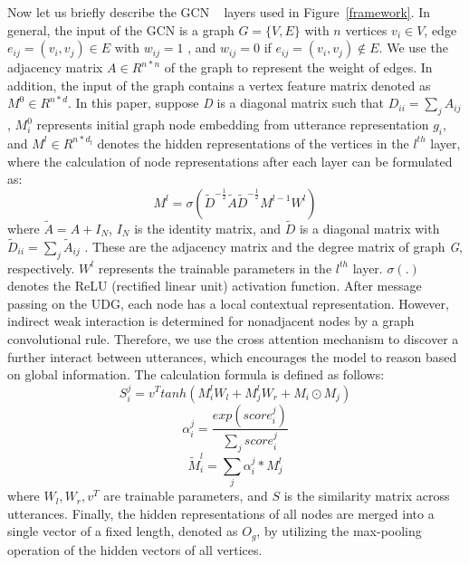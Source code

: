 \documentclass[letterpaper]{article}
\begin{document}
Now let us briefly describe the GCN ~\cite{kipf2016semi} layers used in Figure~\ref{framework}. In general, the input of the GCN is a graph $G=\{V,E\}$ with $n$ vertices $v_i \in V$, edge $e_{ij}=(v_i,v_j) \in E$ with $w_{ij} = 1$ , and $w_{ij} = 0$ if $e_{ij}=(v_i,v_j) \not\in E$. We use the adjacency matrix $A \in R^{n*n}$ of the graph to represent the weight of edges. In addition, the input of the graph contains a vertex feature matrix denoted as $ M^0 \in R^{n*d}$. In this paper, suppose \textit{D} is a diagonal matrix such that $D_{ii}=\sum_j A_{ij}$, $M_i^0$ represents initial graph node embedding from utterance representation $g_i$, and $M^l \in R^{n*d_l}$ denotes the hidden representations of the vertices in the $l^{th}$ layer, where the calculation of node representations after each layer can be formulated as:
\begin{equation}
  M^{l}=\sigma(\tilde{D}^{-\frac{1}{2}} \tilde{A}\tilde{D}^{-\frac{1}{2}} M^{l-1} W^l)
\end{equation}
where $\tilde{A}=A+I_N$, $I_N$ is the identity matrix, and $\tilde{D}$ is a diagonal matrix with $\tilde{D}_{ii}=\sum_j \tilde{A}_{ij}$ . These are the adjacency matrix and the degree matrix of graph \textit{G}, respectively. $W^l$ represents the trainable parameters in the $l^{th}$ layer. $\sigma(.)$ denotes the ReLU (rectified linear unit) activation function. After message passing on the UDG, each node has a local contextual representation. However, indirect weak interaction is determined for nonadjacent nodes by a graph convolutional rule. Therefore, we use the cross attention mechanism to discover a further interact between utterances, which encourages the model to reason based on global information. The calculation formula is defined as follows:
\begin{equation}
  S_i^j=v^T tanh(M_i^l W_l + M_j^l W_r + M_i \odot M_j)
\end{equation}
\begin{equation}
  \alpha_i^j=\frac{exp(score_i^j)}{\sum_j score_i^j}
\end{equation}
\begin{equation}
  \tilde{M}_i^l=\sum_j \alpha_i^j * M_j^l
\end{equation}
where $W_l,W_r,v^T$ are trainable parameters, and $S$ is the similarity matrix across utterances. Finally, the hidden representations of all nodes are merged into a single vector of a fixed length, denoted as $O_g$, by utilizing the max-pooling operation of the hidden vectors of all vertices.
\end{document}
